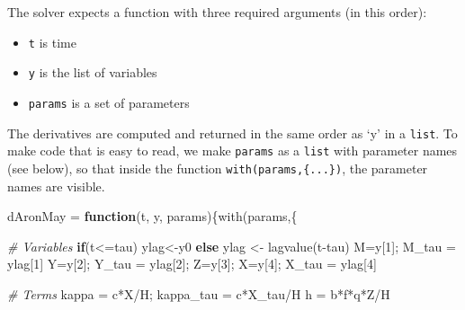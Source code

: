 \documentclass[
]{book}
\newenvironment{Shaded}{\begin{snugshade}}{\end{snugshade}}
\newcommand{\CommentTok}[1]{\textcolor[rgb]{0.56,0.35,0.01}{\textit{#1}}}
\newcommand{\ControlFlowTok}[1]{\textcolor[rgb]{0.13,0.29,0.53}{\textbf{#1}}}
\newcommand{\DecValTok}[1]{\textcolor[rgb]{0.00,0.00,0.81}{#1}}
\newcommand{\FunctionTok}[1]{\textcolor[rgb]{0.00,0.00,0.00}{#1}}
\newcommand{\NormalTok}[1]{#1}
\newcommand{\OtherTok}[1]{\textcolor[rgb]{0.56,0.35,0.01}{#1}}
\newcommand{\SpecialCharTok}[1]{\textcolor[rgb]{0.00,0.00,0.00}{#1}}
\begin{document}
The solver expects a function with three required arguments (in this order):

\begin{itemize}
\item
  \texttt{t} is time
\item
  \texttt{y} is the list of variables
\item
  \texttt{params} is a set of parameters
\end{itemize}

The derivatives are computed and returned in the same order as `y' in a \texttt{list}. To make code that is easy to read, we make \texttt{params} as a \texttt{list} with parameter names (see below), so that inside the function \texttt{with(params,\{...\})}, the parameter names are visible.

\begin{Shaded}
\begin{Highlighting}[]
\NormalTok{dAronMay }\OtherTok{=} \ControlFlowTok{function}\NormalTok{(t, y, params)\{}\FunctionTok{with}\NormalTok{(params,\{}
 
  \CommentTok{\# Variables  }
  \ControlFlowTok{if}\NormalTok{(t}\SpecialCharTok{\textless{}=}\NormalTok{tau) ylag}\OtherTok{\textless{}{-}}\NormalTok{y0 }\ControlFlowTok{else}\NormalTok{ ylag }\OtherTok{\textless{}{-}} \FunctionTok{lagvalue}\NormalTok{(t}\SpecialCharTok{{-}}\NormalTok{tau)}
\NormalTok{  M}\OtherTok{=}\NormalTok{y[}\DecValTok{1}\NormalTok{]; M\_tau }\OtherTok{=}\NormalTok{ ylag[}\DecValTok{1}\NormalTok{]}
\NormalTok{  Y}\OtherTok{=}\NormalTok{y[}\DecValTok{2}\NormalTok{]; Y\_tau }\OtherTok{=}\NormalTok{ ylag[}\DecValTok{2}\NormalTok{]; }
\NormalTok{  Z}\OtherTok{=}\NormalTok{y[}\DecValTok{3}\NormalTok{]; }
\NormalTok{  X}\OtherTok{=}\NormalTok{y[}\DecValTok{4}\NormalTok{]; X\_tau }\OtherTok{=}\NormalTok{ ylag[}\DecValTok{4}\NormalTok{]}
   
  \CommentTok{\# Terms }
\NormalTok{  kappa }\OtherTok{=}\NormalTok{ c}\SpecialCharTok{*}\NormalTok{X}\SpecialCharTok{/}\NormalTok{H; kappa\_tau }\OtherTok{=}\NormalTok{ c}\SpecialCharTok{*}\NormalTok{X\_tau}\SpecialCharTok{/}\NormalTok{H}
\NormalTok{  h }\OtherTok{=}\NormalTok{ b}\SpecialCharTok{*}\NormalTok{f}\SpecialCharTok{*}\NormalTok{q}\SpecialCharTok{*}\NormalTok{Z}\SpecialCharTok{/}\NormalTok{H }
   

\end{Highlighting}
\end{Shaded}
\end{document}
